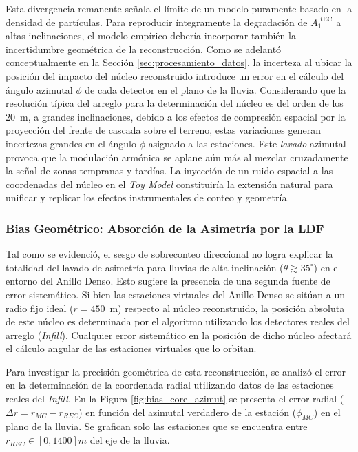 Esta divergencia remanente señala el límite de un modelo puramente basado en la densidad de partículas. Para reproducir íntegramente la degradación de $A_1^{\mathrm{REC}}$ a altas inclinaciones, el modelo empírico debería incorporar también la incertidumbre geométrica de la reconstrucción. Como se adelantó conceptualmente en la Sección \ref{sec:procesamiento_datos}, la incerteza al ubicar la posición del impacto del núcleo reconstruido introduce un error en el cálculo del ángulo azimutal $\phi$ de cada detector en el plano de la lluvia. Considerando que la resolución típica del arreglo para la determinación del núcleo es del orden de los $20$~m, a grandes inclinaciones, debido a los efectos de compresión espacial por la proyección del frente de cascada sobre el terreno, estas variaciones generan incertezas grandes en el ángulo $\phi$ asignado a las estaciones. Este \textit{lavado} azimutal provoca que la modulación armónica se aplane aún más al mezclar cruzadamente la señal de zonas tempranas y tardías. La inyección de un ruido espacial a las coordenadas del núcleo en el \textit{Toy Model} constituiría la extensión natural para unificar y replicar los efectos instrumentales de conteo y geometría.

\subsubsection{Bias Geométrico: Absorción de la Asimetría por la LDF}

Tal como se evidenció, el sesgo de sobreconteo direccional no logra explicar la totalidad del lavado de asimetría para lluvias de alta inclinación ($\theta \gtrsim 35^\circ$) en el entorno del Anillo Denso. Esto sugiere la presencia de una segunda fuente de error sistemático. Si bien las estaciones virtuales del Anillo Denso se sitúan a un radio fijo ideal ($r = 450$~m) respecto al núcleo reconstruido, la posición absoluta de este núcleo es determinada por el algoritmo utilizando los detectores reales del arreglo (\textit{Infill}). Cualquier error sistemático en la posición de dicho núcleo afectará el cálculo angular de las estaciones virtuales que lo orbitan.

Para investigar la precisión geométrica de esta reconstrucción, se analizó el error en la determinación de la coordenada radial utilizando datos de las estaciones reales del \textit{Infill}. En la Figura \ref{fig:bias_core_azimut} se presenta el error radial ($\Delta r = r_{MC} - r_{REC}$) en función del azimutal verdadero de la estación ($\phi_{MC}$) en el plano de la lluvia. Se grafican solo las estaciones que se encuentra entre $r_{REC} \in [0,1400]m$ del eje de la lluvia.

